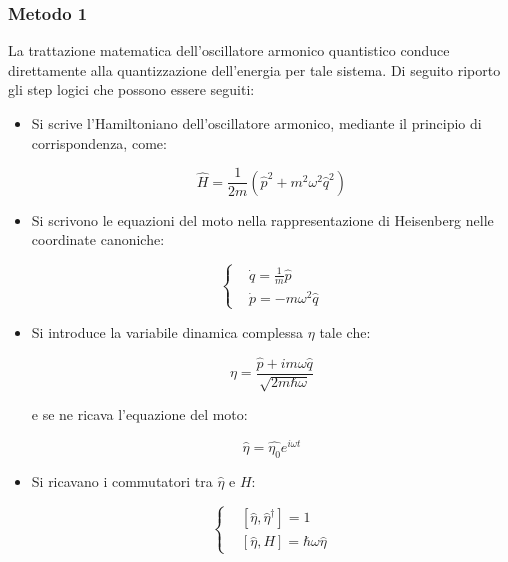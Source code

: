 \documentclass{article}
\begin{document}
\subsubsection{Metodo 1}
La trattazione matematica dell'oscillatore armonico quantistico conduce direttamente alla quantizzazione dell'energia per tale sistema.
Di seguito riporto gli step logici che possono essere seguiti:

\begin{itemize}
    \item Si scrive l'Hamiltoniano dell'oscillatore armonico, mediante il principio di corrispondenza, come:

          \begin{equation}
              \hat{H}=\frac{1}{2m}(\hat{p}^2+m^2\omega^2\hat{q}^2)
          \end{equation}
    \item Si scrivono le equazioni del moto nella rappresentazione di Heisenberg nelle coordinate canoniche:

          \begin{equation}
              \left\{
              \begin{aligned}
                   & \dot{q}=\frac{1}{m}\hat{p} \\
                   & \dot{p}=-m\omega^2\hat{q}
              \end{aligned}
              \right.
          \end{equation}

    \item Si introduce la variabile dinamica complessa $\eta$ tale che:

          \begin{equation}
              \eta= \frac{\hat{p}+im\omega \hat{q}}{\sqrt{2m\hbar \omega}}
          \end{equation}

          e se ne ricava l'equazione del moto:

          \begin{equation}
              \hat{\eta}=\hat{\eta_0} e^{i\omega t}
          \end{equation}

    \item Si ricavano i commutatori tra $\hat{\eta}$ e $H$:

          \begin{equation}
              \left\{
              \begin{aligned}
                   & [\hat{\eta},\hat{\eta}^{\dagger}]=1    \\
                   & [\hat{\eta},H]=\hbar \omega \hat{\eta}
              \end{aligned}
              \right.
          \end{equation}


\end{itemize}
\end{document}
